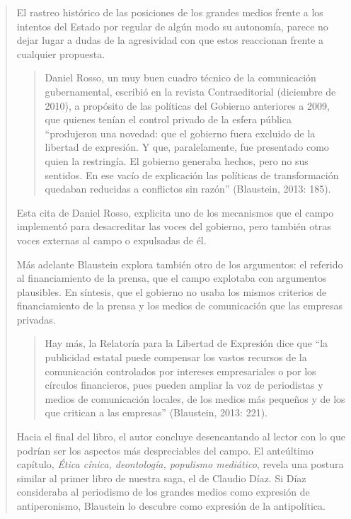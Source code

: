 \begin{quote}
El rastreo histórico de las posiciones de los grandes medios frente a los intentos del Estado por regular de algún modo su autonomía, parece no dejar lugar a dudas de la agresividad con que estos reaccionan frente a cualquier propuesta.

\begin{quote}
	Daniel Rosso, un muy buen cuadro técnico de la comunicación gubernamental, escribió en la revista Contraeditorial (diciembre de 2010), a propósito de las políticas del Gobierno anteriores a 2009, que quienes tenían el control privado de la esfera pública ``produjeron una novedad: que el gobierno fuera excluido de la libertad de expresión. Y que, paralelamente, fue presentado como quien la restringía. El gobierno generaba hechos, pero no sus sentidos. En ese vacío de explicación las políticas de transformación quedaban reducidas a conflictos sin razón'' (Blaustein, 2013: 185).
\end{quote}


Esta cita de Daniel Rosso, explicita uno de los mecanismos que el campo implementó para desacreditar las voces del gobierno, pero también otras voces externas al campo o expulsadas de él.

Más adelante Blaustein explora también otro de los argumentos: el referido al financiamiento de la prensa, que el campo explotaba con argumentos plausibles. En síntesis, que el gobierno no usaba los mismos criterios de financiamiento de la prensa y los medios de comunicación que las empresas privadas.

\begin{quote}
	Hay más, la Relatoría para la Libertad de Expresión dice que \enquote{la publicidad estatal puede compensar los vastos recursos de la comunicación controlados por intereses empresariales o por los círculos financieros, pues pueden ampliar la voz de periodistas y medios de comunicación locales, de los medios más pequeños y de los que critican a las empresas} (Blaustein, 2013: 221).
\end{quote}


Hacia el final del libro, el autor concluye desencantando al lector con lo que podrían ser los aspectos más despreciables del campo. El anteúltimo capítulo, \emph{Ética cínica, deontología, populismo mediático}, revela una postura similar al primer libro de nuestra saga, el de Claudio Díaz. Si Díaz consideraba al periodismo de los grandes medios como expresión de antiperonismo, Blaustein lo descubre como expresión de la antipolítica.


\end{quote}
